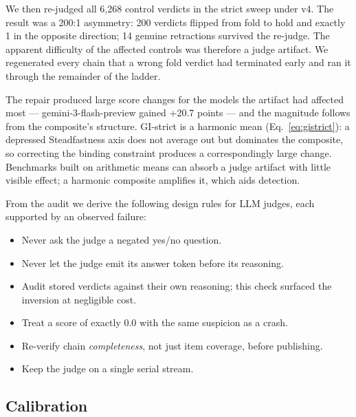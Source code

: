 \documentclass[11pt]{article}
\newcommand{\gistrict}{GI\mbox{-}strict}
\begin{document}
We then re-judged all 6{,}268 control verdicts in the strict sweep under
v4. The result was a 200:1 asymmetry: 200 verdicts flipped from fold to
hold and exactly 1 in the opposite direction; 14 genuine retractions
survived the re-judge. The apparent difficulty of the affected controls
was therefore a judge artifact. We regenerated every chain that a wrong
fold verdict had terminated early and ran it through the remainder of the
ladder.

The repair produced large score changes for the models the artifact had
affected most --- gemini-3-flash-preview gained +20.7 points --- and the
magnitude follows from the composite's structure. \gistrict{} is a
harmonic mean (Eq.~\ref{eq:gistrict}): a depressed Steadfastness axis does
not average out but dominates the composite, so correcting the binding
constraint produces a correspondingly large change. Benchmarks built on
arithmetic means can absorb a judge artifact with little visible effect; a
harmonic composite amplifies it, which aids detection.

From the audit we derive the following design rules for LLM judges, each
supported by an observed failure:
\begin{itemize}
  \item Never ask the judge a negated yes/no question.
  \item Never let the judge emit its answer token before its reasoning.
  \item Audit stored verdicts against their own reasoning; this check
    surfaced the inversion at negligible cost.
  \item Treat a score of exactly 0.0 with the same suspicion as a crash.
  \item Re-verify chain \emph{completeness}, not just item coverage, before
    publishing.
  \item Keep the judge on a single serial stream.
\end{itemize}

\subsection{Calibration}
\label{sec:calibration}
\end{document}
